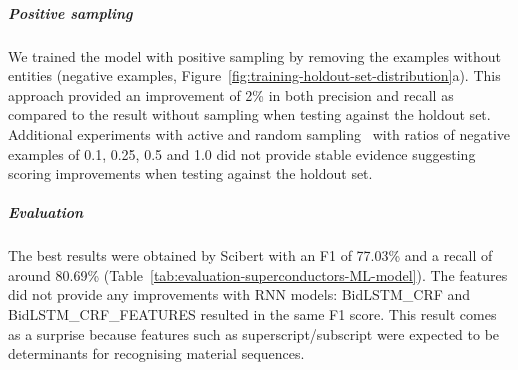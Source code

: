 \subparagraph*{Positive sampling}
We trained the model with positive sampling by removing the examples without entities (negative examples, Figure~\ref{fig:training-holdout-set-distribution}a).
This approach provided an improvement of 2\% in both precision and recall as compared to the result without sampling when testing against the holdout set.
Additional experiments with active and random sampling~\cite{lopez2021mining} with ratios of negative examples of 0.1, 0.25, 0.5 and 1.0 did not provide stable evidence suggesting scoring improvements when testing against the holdout set. 

\subparagraph*{Evaluation}
The best results were obtained by Scibert with an F1 of 77.03\% and a recall of around 80.69\% (Table~\ref{tab:evaluation-superconductors-ML-model}).
The features did not provide any improvements with RNN models: BidLSTM\_CRF and BidLSTM\_CRF\_FEATURES resulted in the same F1 score.
This result comes as a surprise because features such as superscript/subscript were expected to be determinants for recognising material sequences.


